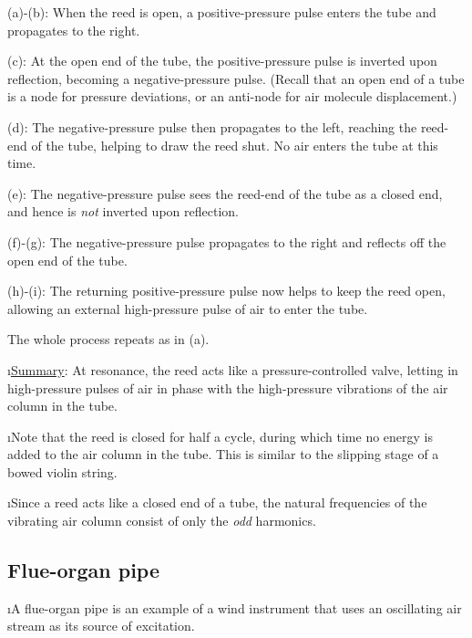 (a)-(b): When the reed is open, a positive-pressure
pulse enters the tube and propagates to the right.

(c): At the open end of the tube, the 
positive-pressure pulse is inverted upon reflection, 
becoming a negative-pressure pulse.
(Recall that an open end of a tube is a node 
for pressure deviations, or an anti-node for air 
molecule displacement.)

(d): The negative-pressure pulse then propagates 
to the left, reaching the reed-end of the tube, helping
to draw the reed shut.
No air enters the tube at this time.

(e): The negative-pressure pulse sees the 
reed-end of the tube as a closed end, and hence 
is {\em not} inverted upon reflection.

(f)-(g): The negative-pressure pulse propagates 
to the right and reflects off the open end of the tube.

(h)-(i): The returning positive-pressure pulse 
now helps to keep the reed open,
allowing an external high-pressure pulse of air
to enter the tube.

The whole process repeats as in (a).

\i \underline{Summary}: 
At resonance, the reed acts like a pressure-controlled valve, 
letting in high-pressure pulses of air in phase
with the high-pressure vibrations of the air column in the tube.

\i Note that the reed is closed for half a cycle,
during which time no energy is added to the air column
in the tube.
This is similar to the slipping stage of a bowed violin string.

\i Since a reed acts like a closed end of a tube,
the natural frequencies of the vibrating air column 
consist of only the {\em odd} harmonics.

\ei
\subsection{Flue-organ pipe}
\bi

\i A flue-organ pipe is an example of a wind
instrument that uses an oscillating air stream as
its source of excitation.


